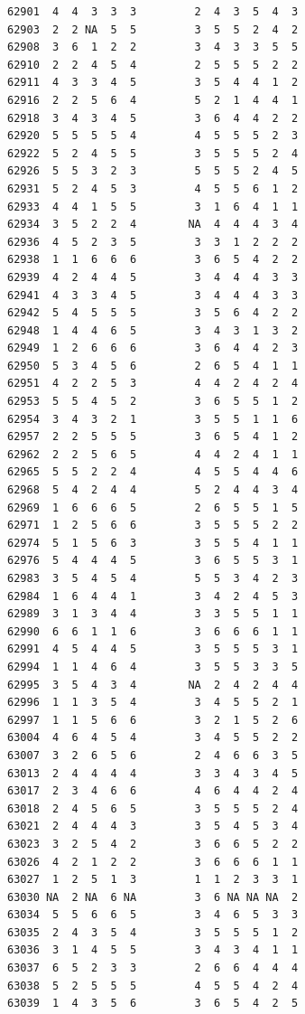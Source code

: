 \documentclass[
  letterpaper,
  DIV=11,
  numbers=noendperiod]{scrreprt}
\begin{document}
\begin{verbatim}
62901  4  4  3  3  3         2  4  3  5  4  3
62903  2  2 NA  5  5         3  5  5  2  4  2
62908  3  6  1  2  2         3  4  3  3  5  5
62910  2  2  4  5  4         2  5  5  5  2  2
62911  4  3  3  4  5         3  5  4  4  1  2
62916  2  2  5  6  4         5  2  1  4  4  1
62918  3  4  3  4  5         3  6  4  4  2  2
62920  5  5  5  5  4         4  5  5  5  2  3
62922  5  2  4  5  5         3  5  5  5  2  4
62926  5  5  3  2  3         5  5  5  2  4  5
62931  5  2  4  5  3         4  5  5  6  1  2
62933  4  4  1  5  5         3  1  6  4  1  1
62934  3  5  2  2  4        NA  4  4  4  3  4
62936  4  5  2  3  5         3  3  1  2  2  2
62938  1  1  6  6  6         3  6  5  4  2  2
62939  4  2  4  4  5         3  4  4  4  3  3
62941  4  3  3  4  5         3  4  4  4  3  3
62942  5  4  5  5  5         3  5  6  4  2  2
62948  1  4  4  6  5         3  4  3  1  3  2
62949  1  2  6  6  6         3  6  4  4  2  3
62950  5  3  4  5  6         2  6  5  4  1  1
62951  4  2  2  5  3         4  4  2  4  2  4
62953  5  5  4  5  2         3  6  5  5  1  2
62954  3  4  3  2  1         3  5  5  1  1  6
62957  2  2  5  5  5         3  6  5  4  1  2
62962  2  2  5  6  5         4  4  2  4  1  1
62965  5  5  2  2  4         4  5  5  4  4  6
62968  5  4  2  4  4         5  2  4  4  3  4
62969  1  6  6  6  5         2  6  5  5  1  5
62971  1  2  5  6  6         3  5  5  5  2  2
62974  5  1  5  6  3         3  5  5  4  1  1
62976  5  4  4  4  5         3  6  5  5  3  1
62983  3  5  4  5  4         5  5  3  4  2  3
62984  1  6  4  4  1         3  4  2  4  5  3
62989  3  1  3  4  4         3  3  5  5  1  1
62990  6  6  1  1  6         3  6  6  6  1  1
62991  4  5  4  4  5         3  5  5  5  3  1
62994  1  1  4  6  4         3  5  5  3  3  5
62995  3  5  4  3  4        NA  2  4  2  4  4
62996  1  1  3  5  4         3  4  5  5  2  1
62997  1  1  5  6  6         3  2  1  5  2  6
63004  4  6  4  5  4         3  4  5  5  2  2
63007  3  2  6  5  6         2  4  6  6  3  5
63013  2  4  4  4  4         3  3  4  3  4  5
63017  2  3  4  6  6         4  6  4  4  2  4
63018  2  4  5  6  5         3  5  5  5  2  4
63021  2  4  4  4  3         3  5  4  5  3  4
63023  3  2  5  4  2         3  6  6  5  2  2
63026  4  2  1  2  2         3  6  6  6  1  1
63027  1  2  5  1  3         1  1  2  3  3  1
63030 NA  2 NA  6 NA         3  6 NA NA NA  2
63034  5  5  6  6  5         3  4  6  5  3  3
63035  2  4  3  5  4         3  5  5  5  1  2
63036  3  1  4  5  5         3  4  3  4  1  1
63037  6  5  2  3  3         2  6  6  4  4  4
63038  5  2  5  5  5         4  5  5  4  2  4
63039  1  4  3  5  6         3  6  5  4  2  5

\end{verbatim}
\end{document}
